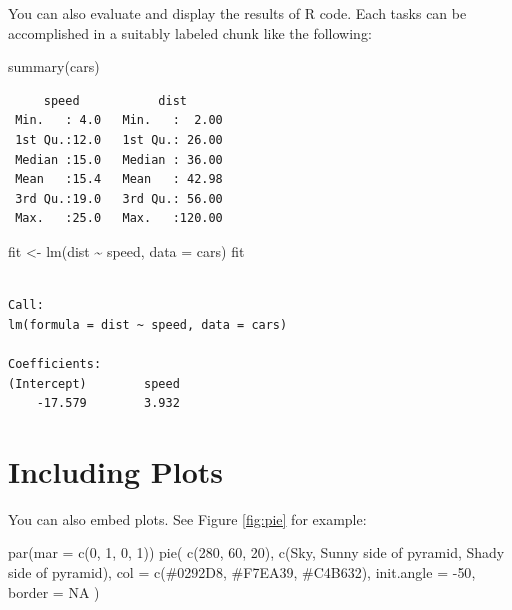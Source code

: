 \documentclass[
]{book}
\newenvironment{Shaded}{\begin{snugshade}}{\end{snugshade}}
\newcommand{\AttributeTok}[1]{\textcolor[rgb]{0.77,0.63,0.00}{#1}}
\newcommand{\ConstantTok}[1]{\textcolor[rgb]{0.00,0.00,0.00}{#1}}
\newcommand{\DecValTok}[1]{\textcolor[rgb]{0.00,0.00,0.81}{#1}}
\newcommand{\FunctionTok}[1]{\textcolor[rgb]{0.00,0.00,0.00}{#1}}
\newcommand{\NormalTok}[1]{#1}
\newcommand{\OtherTok}[1]{\textcolor[rgb]{0.56,0.35,0.01}{#1}}
\newcommand{\SpecialCharTok}[1]{\textcolor[rgb]{0.00,0.00,0.00}{#1}}
\newcommand{\StringTok}[1]{\textcolor[rgb]{0.31,0.60,0.02}{#1}}
\begin{document}
You can also evaluate and display the results of R code. Each tasks can be accomplished in a suitably labeled chunk like the following:

\begin{Shaded}
\begin{Highlighting}[]
\FunctionTok{summary}\NormalTok{(cars)}
\end{Highlighting}
\end{Shaded}

\begin{verbatim}
     speed           dist       
 Min.   : 4.0   Min.   :  2.00  
 1st Qu.:12.0   1st Qu.: 26.00  
 Median :15.0   Median : 36.00  
 Mean   :15.4   Mean   : 42.98  
 3rd Qu.:19.0   3rd Qu.: 56.00  
 Max.   :25.0   Max.   :120.00  
\end{verbatim}

\begin{Shaded}
\begin{Highlighting}[]
\NormalTok{fit }\OtherTok{\textless{}{-}} \FunctionTok{lm}\NormalTok{(dist }\SpecialCharTok{\textasciitilde{}}\NormalTok{ speed, }\AttributeTok{data =}\NormalTok{ cars)}
\NormalTok{fit}
\end{Highlighting}
\end{Shaded}

\begin{verbatim}

Call:
lm(formula = dist ~ speed, data = cars)

Coefficients:
(Intercept)        speed  
    -17.579        3.932  
\end{verbatim}

\hypertarget{including-plots}{%
\section{Including Plots}\label{including-plots}}

You can also embed plots. See Figure \ref{fig:pie} for example:

\begin{Shaded}
\begin{Highlighting}[]
\FunctionTok{par}\NormalTok{(}\AttributeTok{mar =} \FunctionTok{c}\NormalTok{(}\DecValTok{0}\NormalTok{, }\DecValTok{1}\NormalTok{, }\DecValTok{0}\NormalTok{, }\DecValTok{1}\NormalTok{))}
\FunctionTok{pie}\NormalTok{(}
  \FunctionTok{c}\NormalTok{(}\DecValTok{280}\NormalTok{, }\DecValTok{60}\NormalTok{, }\DecValTok{20}\NormalTok{),}
  \FunctionTok{c}\NormalTok{(}\StringTok{\textquotesingle{}Sky\textquotesingle{}}\NormalTok{, }\StringTok{\textquotesingle{}Sunny side of pyramid\textquotesingle{}}\NormalTok{, }\StringTok{\textquotesingle{}Shady side of pyramid\textquotesingle{}}\NormalTok{),}
  \AttributeTok{col =} \FunctionTok{c}\NormalTok{(}\StringTok{\textquotesingle{}\#0292D8\textquotesingle{}}\NormalTok{, }\StringTok{\textquotesingle{}\#F7EA39\textquotesingle{}}\NormalTok{, }\StringTok{\textquotesingle{}\#C4B632\textquotesingle{}}\NormalTok{),}
  \AttributeTok{init.angle =} \SpecialCharTok{{-}}\DecValTok{50}\NormalTok{, }\AttributeTok{border =} \ConstantTok{NA}
\NormalTok{)}
\end{Highlighting}
\end{Shaded}
\end{document}
